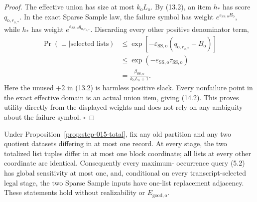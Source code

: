 \begin{proof}
The effective union has size at most \(k_{\mathrm o}L_{\mathrm o}\).
By (13.2), an item \(h_*\) has score
\(q_{\mathrm o,r_{\mathrm o,*}}\). In the exact Sparse Sample law, the
failure symbol has weight
\(e^{\varepsilon_{\mathrm{SS,o}}B_{\mathrm o}}\), while \(h_*\) has
weight
\(e^{\varepsilon_{\mathrm{SS,o}}q_{\mathrm o,r_{\mathrm o,*}}}\).
Discarding every other positive denominator term,
\[
\begin{aligned}
\Pr(\perp\mid\text{selected lists})
&\le
\exp[-\varepsilon_{\mathrm{SS,o}}
(q_{\mathrm o,r_{\mathrm o,*}}-B_{\mathrm o})]\\
&\le
\exp(-\varepsilon_{\mathrm{SS,o}}\tau_{\mathrm{SS,o}})\\
&=\frac{\beta_{\mathrm{SS,o}}}
{k_{\mathrm o}L_{\mathrm o}+1}.
\end{aligned}
\tag{14.3}
\]
Here the unused \(+2\) in (13.2) is harmless positive slack. Every
nonfailure point in the exact effective domain is an actual union item,
giving (14.2). This proves utility directly from the displayed weights and
does not rely on any ambiguity about the failure symbol.
\(\square\)


\end{proof}

\begin{lemma}\label{lem:step-015-locality}
Under Proposition~\ref{prop:step-015-total}, fix any old partition and any
two quotient datasets differing in at most one record. At every stage, the
two totalized list tuples differ in at most one block coordinate; all lists
at every other coordinate are identical. Consequently every maximum-
occurrence query (5.2) has global sensitivity at most one, and, conditional
on every transcript-selected legal stage, the two Sparse Sample inputs
have one-list replacement adjacency. These statements hold without
realizability or \(E_{\mathrm{good,o}}\).


\end{lemma}

